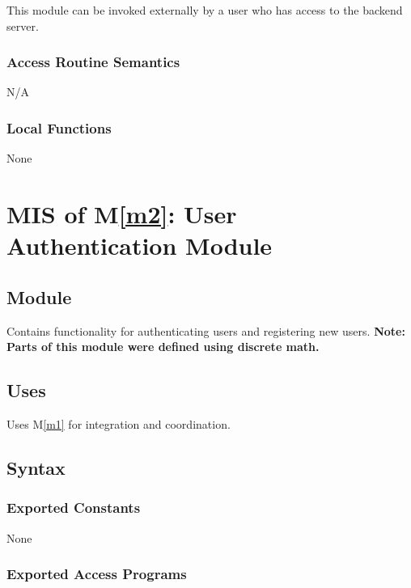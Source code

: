 \documentclass[12pt, titlepage]{article}
\begin{document}
This module can be invoked externally by a user who has access to the backend server.

\subsubsection{Access Routine Semantics}

N/A

\subsubsection{Local Functions}

None

\newpage

\section{MIS of M\ref{m2}: User Authentication Module}

\subsection{Module}

Contains functionality for authenticating users and registering new users. \textbf{Note: Parts of this module were defined using discrete math.}

\subsection{Uses}

Uses M\ref{m1} for integration and coordination.

\subsection{Syntax}

\subsubsection{Exported Constants}

None

\subsubsection{Exported Access Programs}
\end{document}

